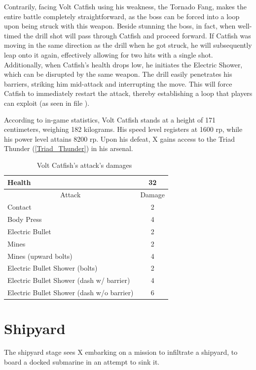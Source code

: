 Contrarily, facing Volt Catfish using his weakness, the Tornado Fang, makes the entire battle completely straightforward, as the boss can be forced into a loop upon being struck with this weapon. Beside stunning the boss, in fact, when well-timed the drill shot will pass through Catfish and proceed forward. If Catfish was moving in the same direction as the drill when he got struck, he will subsequently leap onto it again, effectively allowing for two hits with a single shot. Additionally, when Catfish's health drops low, he initiates the Electric Shower, which can be disrupted by the same weapon. The drill easily penetrates his barriers, striking him mid-attack and interrupting the move. This will force Catfish to immediately restart the attack, thereby establishing a loop that players can exploit (as seen in file ).

According to in-game statistics, Volt Catfish stands at a height of 171 centimeters, weighing 182 kilograms. His speed level registers at 1600 rp, while his power level attains 8200 rp. Upon his defeat, X gains access to the Triad Thunder (\ref{Triad_Thunder}) in his arsenal.

\begin{table}[htp]
	\centering
	\begin{tabular}[h]{l c}
		\toprule
		Health  & 32\\
		\midrule
		\multicolumn{1}{c}{Attack} & \multicolumn{1}{c}{Damage}\\
		Contact & 2\\
		Body Press & 4\\
		Electric Bullet& 2\\
		Mines & 2\\
		Mines (upward bolts) & 4\\
		Electric Bullet Shower (bolts)& 2\\
		Electric Bullet Shower (dash w/ barrier)& 4\\
		Electric Bullet Shower (dash w/o barrier)& 6\\
		\bottomrule
	\end{tabular}
	\caption{Volt Catfish's attack's damages~\cite{wiki:Volt_catfish,book:Compendium}}
\end{table} 

\section{Shipyard}
The shipyard stage sees X embarking on a mission to infiltrate a shipyard, to board a docked submarine in an attempt to sink it. 

